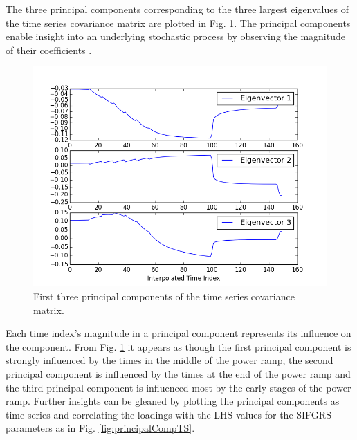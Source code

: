 The three principal components corresponding to the three largest eigenvalues of the time series covariance matrix are plotted in Fig. \ref{fig:fgrEvecs}. The principal components enable insight into an underlying stochastic process by observing the magnitude of their coefficients \cite{Bisgaard}.  
\begin{figure}
\caption{\label{fig:fgrEvecs}
First three principal components of the time series covariance matrix.}
 \begin{center}
  \includegraphics[scale=.75]{./Chapter4/fgr_evecs.png}
 \end{center}
\end{figure}
Each time index's magnitude in a principal component represents its influence on the component. From Fig. \ref{fig:fgrEvecs} it appears as though the first principal component is strongly influenced by the times in the middle of the power ramp, the second principal component is influenced by the times at the end of the power ramp and the third principal component is influenced most by the early stages of the power ramp. Further insights can be gleaned by plotting the principal components as time series and correlating the loadings with the \ac{LHS} values for the \ac{SIFGRS} parameters as in Fig. \ref{fig:principalCompTS}.     
